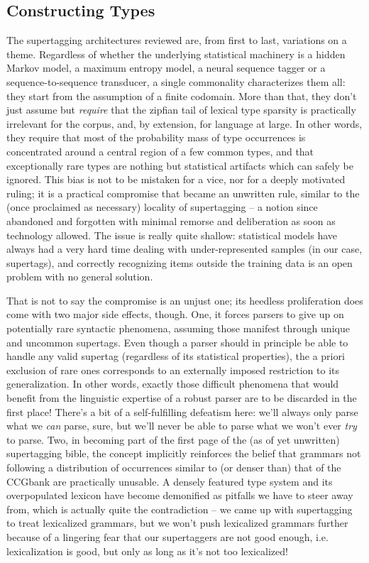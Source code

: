 \subsection{Constructing Types}
The supertagging architectures reviewed are, from first to last, variations on a theme.
Regardless of whether the underlying statistical machinery is a hidden Markov model, a maximum entropy model, a neural sequence tagger or a sequence-to-sequence transducer, a single commonality characterizes them all: they start from the assumption of a finite codomain.
More than that, they don't just assume but \textit{require} that the zipfian tail of lexical type sparsity is practically irrelevant for the corpus, and, by extension, for language at large.
In other words, they require that most of the probability mass of type occurrences is concentrated around a central region of a few common types, and that exceptionally rare types are nothing but statistical artifacts which can safely be ignored.
This bias is not to be mistaken for a vice, nor for a deeply motivated ruling; it is a practical compromise that became an unwritten rule, similar to the (once proclaimed as necessary) locality of supertagging -- a notion since abandoned and forgotten with minimal remorse and deliberation as soon as technology allowed.
The issue is really quite shallow: statistical models have always had a very hard time dealing with under-represented samples (in our case, supertags), and correctly recognizing items outside the training data is an open problem with no general solution.

That is not to say the compromise is an unjust one; its heedless proliferation does come with two major side effects, though.
One, it forces parsers to give up on potentially rare syntactic phenomena, assuming those manifest through unique and uncommon supertags.
Even though a parser should in principle be able to handle any valid supertag (regardless of its statistical properties), the a priori exclusion of rare ones corresponds to an externally imposed restriction to its generalization.
In other words, exactly those difficult phenomena that would benefit from the linguistic expertise of a robust parser are to be discarded in the first place!
There's a bit of a self-fulfilling defeatism here: we'll always only parse what we \textit{can} parse, sure, but we'll never be able to parse what we won't ever \textit{try} to parse.
Two, in becoming part of the first page of the (as of yet unwritten) supertagging bible, the concept implicitly reinforces the belief that grammars not following a distribution of occurrences similar to (or denser than) that of the CCGbank are practically unusable.
A densely featured type system and its overpopulated lexicon have become demonified as pitfalls we have to steer away from, which is actually quite the contradiction -- we came up with supertagging to treat lexicalized grammars, but we won't push lexicalized grammars further because of a lingering fear that our supertaggers are not good enough, i.e. lexicalization is good, but only as long as it's not too lexicalized! 


